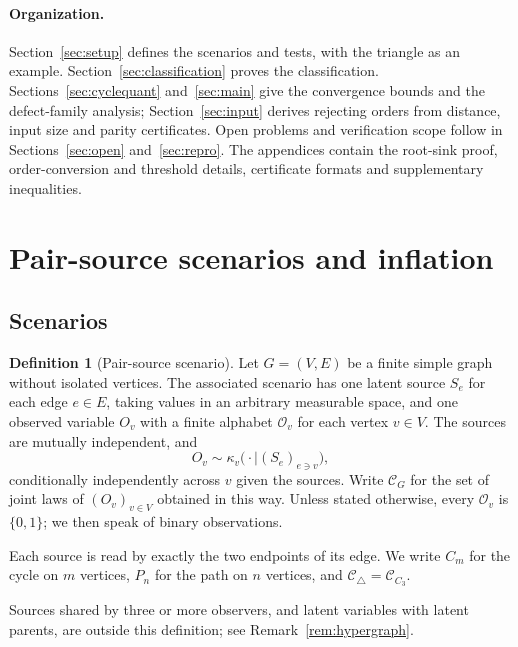 \documentclass[11pt]{article}
\theoremstyle{plain}
\theoremstyle{definition}
\newtheorem{definition}[theorem]{Definition}
\newcommand{\Ctri}{\mathcal C_{\triangle}}
\begin{document}
\paragraph{Organization.}
Section~\ref{sec:setup} defines the scenarios and tests, with the triangle as an example. Section~\ref{sec:classification} proves the classification. Sections~\ref{sec:cyclequant} and~\ref{sec:main} give the convergence bounds and the defect-family analysis; Section~\ref{sec:input} derives rejecting orders from distance, input size and parity certificates. Open problems and verification scope follow in Sections~\ref{sec:open} and~\ref{sec:repro}. The appendices contain the root-sink proof, order-conversion and threshold details, certificate formats and supplementary inequalities.

\section{Pair-source scenarios and inflation}\label{sec:pairsource}\label{sec:setup}

\providecommand{\Cscen}[1]{\mathcal C_{#1}}
\providecommand{\supp}{\operatorname{supp}}

\subsection{Scenarios}

\begin{definition}[Pair-source scenario]\label{def:pairsource}
Let $G=(V,E)$ be a finite simple graph without isolated vertices. The associated scenario has one latent source $S_e$ for each edge $e\in E$, taking values in an arbitrary measurable space, and one observed variable $O_v$ with a finite alphabet $\mathcal O_v$ for each vertex $v\in V$. The sources are mutually independent, and
\[
O_v\sim\kappa_v\bigl(\cdot\mid(S_e)_{e\ni v}\bigr),
\]
conditionally independently across $v$ given the sources. Write $\Cscen{G}$ for the set of joint laws of $(O_v)_{v\in V}$ obtained in this way. Unless stated otherwise, every $\mathcal O_v$ is $\{0,1\}$; we then speak of binary observations.
\end{definition}

Each source is read by exactly the two endpoints of its edge. We write $C_m$ for the cycle on $m$ vertices, $P_n$ for the path on $n$ vertices, and $\Ctri=\Cscen{C_3}$.

Sources shared by three or more observers, and latent variables with latent parents, are outside this definition; see Remark~\ref{rem:hypergraph}.
\end{document}
